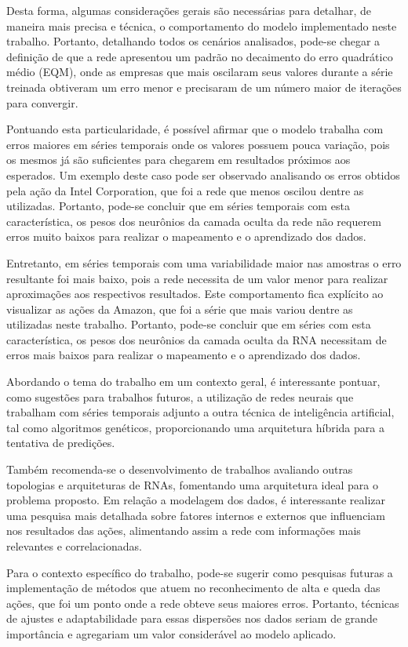 Desta forma, algumas considerações gerais são necessárias para detalhar, de maneira mais precisa e técnica, o comportamento do modelo implementado neste trabalho. Portanto, detalhando todos os cenários analisados, pode-se chegar a definição de que a rede apresentou um padrão no decaimento do erro quadrático médio (EQM), onde as empresas que mais oscilaram seus valores durante a série treinada obtiveram um erro menor e precisaram de um número maior de iterações para convergir. 

Pontuando esta particularidade, é possível afirmar que o modelo trabalha com erros maiores em séries temporais onde os valores possuem pouca variação, pois os mesmos já são suficientes para chegarem em resultados próximos aos esperados. Um exemplo deste caso pode ser observado analisando os erros obtidos pela ação da Intel Corporation, que foi a rede que menos oscilou dentre as utilizadas. Portanto, pode-se concluir que em séries temporais com esta característica, os pesos dos neurônios da camada oculta da rede não requerem erros muito baixos para realizar o mapeamento e o aprendizado dos dados. 

Entretanto, em séries temporais com uma variabilidade maior nas amostras o erro resultante foi mais baixo, pois a rede necessita de um valor menor para realizar aproximações aos respectivos resultados. Este comportamento fica explícito ao visualizar as ações da Amazon, que foi a série que mais variou dentre as utilizadas neste trabalho. Portanto, pode-se concluir que em séries com esta característica, os pesos dos neurônios da camada oculta da RNA necessitam de erros mais baixos para realizar o mapeamento e o aprendizado dos dados.

Abordando o tema do trabalho em um contexto geral, é interessante pontuar, como sugestões para trabalhos futuros, a utilização de redes neurais que trabalham com séries temporais adjunto a outra técnica de inteligência artificial, tal como algoritmos genéticos, proporcionando uma arquitetura híbrida para a tentativa de predições. 

Também recomenda-se o desenvolvimento de trabalhos avaliando outras topologias e arquiteturas de RNAs, fomentando uma arquitetura ideal para o problema proposto. Em relação a modelagem dos dados, é interessante realizar uma pesquisa mais detalhada sobre fatores internos e externos que influenciam nos resultados das ações, alimentando assim a rede com informações mais relevantes e correlacionadas.

Para o contexto específico do trabalho, pode-se sugerir como pesquisas futuras a implementação de métodos que atuem no reconhecimento de alta e queda das ações, que foi um ponto onde a rede obteve seus maiores erros. Portanto, técnicas de ajustes e adaptabilidade para essas dispersões nos dados seriam de grande importância e agregariam um valor considerável ao modelo aplicado.
